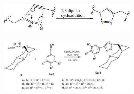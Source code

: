 \begin{figure}[H]
	\centering
	\includegraphics[width=0.6\textwidth]{assets/1012}
	\caption*{}
\end{figure}

\begin{figure}[H]
	\centering
	\includegraphics[width=0.6\textwidth]{assets/1013}
	\caption*{}
\end{figure}

